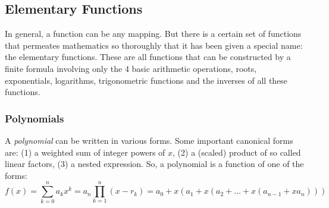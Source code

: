 \subsection{Elementary Functions}
In general, a function can be any mapping. But there is a certain set of functions that permeates mathematics so thoroughly that it has been given a special name: the elementary functions. These are all functions that can be constructed by a finite formula involving only the 4 basic arithmetic operations, roots, exponentials, logarithms, trigonometric functions and the inverses of all these functions.


\subsubsection{Polynomials}
A \emph{polynomial} can be written in various forms. Some important canonical forms are: (1) a weighted sum of integer powers of $x$, (2) a (scaled) product of so called linear factors, (3) a nested expression. So, a polynomial is a function of one of the forms:
\begin{equation}
 f(x) = \sum_{k=0}^n a_k x^k 
      = a_n \prod_{k=1}^{n} (x - r_k)
      = a_0 + x(a_1 + x(a_2 + \ldots + x(a_{n-1} + x a_n)))
\end{equation}

